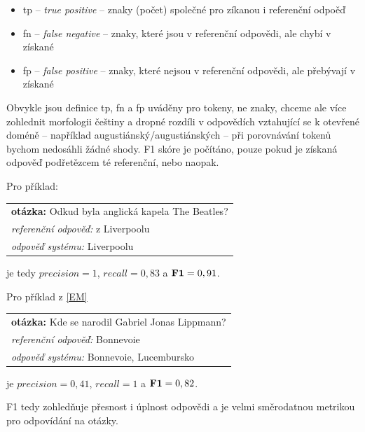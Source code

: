 \begin{itemize}
    \item tp -- \emph{true positive} -- znaky (počet) společné pro zíkanou i referenční odpoěď
    \item fn -- \emph{false negative} -- znaky, které jsou v referenční odpovědi, ale chybí v získané
    \item fp -- \emph{false positive} -- znaky, které nejsou v referenční odpovědi, ale přebývají v získané
\end{itemize}

Obvykle jsou definice tp, fn a fp uváděny pro tokeny, ne znaky, chceme ale více zohlednit morfologii češtiny a dropné rozdíli v odpovědích vztahující se k otevřené doméně -- například augustiánský/augustiánských -- při porovnávání tokenů bychom nedosáhli žádné shody. F1 skóre je počítáno, pouze pokud je získaná odpověď podřetězcem té referenční, nebo naopak.\par \medskip
\noindent Pro příklad: 
\begin{center}
\begin{tabular}{l}
    \textbf{otázka:} Odkud byla anglická kapela The Beatles?\\
    \emph{referenční odpověď:} z Liverpoolu\\
    \emph{odpověď systému:} Liverpoolu\\
\end{tabular}
\end{center}
je tedy $precision = 1$, $recall = 0,83$ a $\text{\textbf{F1}} = 0,91$.\par \medskip
\noindent Pro příklad z \ref{EM}
\begin{center}
\begin{tabular}{l}
    \textbf{otázka:} Kde se narodil Gabriel Jonas Lippmann?\\
    \emph{referenční odpověď:} Bonnevoie\\
    \emph{odpověď systému:} Bonnevoie, Lucembursko\\
\end{tabular}
\end{center}
je $precision = 0,41$, $recall = 1$ a $\text{\textbf{F1}} = 0,82$.\par \medskip
F1 tedy zohledňuje přesnost i úplnost odpovědi a je velmi směrodatnou metrikou pro odpovídání na otázky.

